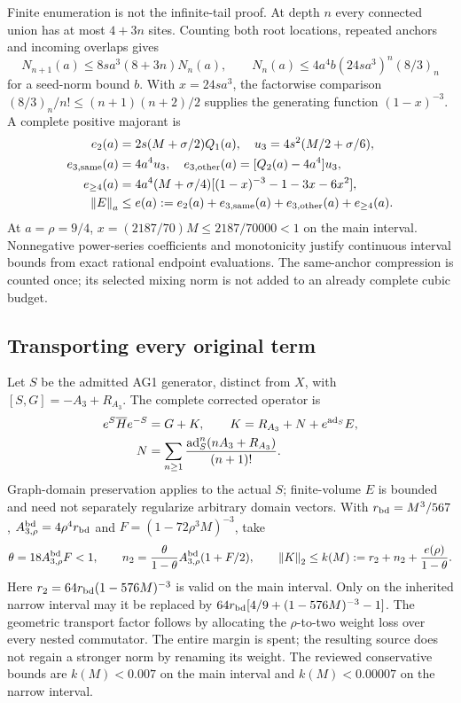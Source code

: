 Finite enumeration is not the infinite-tail proof. At depth $n$ every connected union has at most $4+3n$ sites. Counting both root locations, repeated anchors and incoming overlaps gives
\begin{equation}
N_{n+1}(a)\le8sa^3(8+3n)N_n(a),\qquad
N_n(a)\le4a^4b(24sa^3)^n(8/3)_n
\label{ag2:recurrence}
\end{equation}
for a seed-norm bound $b$. With $x=24sa^3$, the factorwise comparison
$(8/3)_n/n!\le(n+1)(n+2)/2$ supplies the generating function $(1-x)^{-3}$. A complete positive majorant is
\begin{align}
e_2(a)&=2s(M+\sigma/2)Q_1(a),\quad u_3=4s^2(M/2+\sigma/6),\nonumber\\
e_{3,\rm same}(a)&=4a^4u_3,\quad e_{3,\rm other}(a)=[Q_2(a)-4a^4]u_3,\nonumber\\
e_{\ge4}(a)&=4a^4(M+\sigma/4)[(1-x)^{-3}-1-3x-6x^2],\nonumber\\
\left\lVert E\right\rVert_a&\le e(a):=e_2(a)+e_{3,\rm same}(a)+e_{3,\rm other}(a)+e_{\ge4}(a).
\label{ag2:majorant}
\end{align}
At $a=\rho=9/4$, $x=(2187/70)M\le2187/70000<1$ on the main interval. Nonnegative power-series coefficients and monotonicity justify continuous interval bounds from exact rational endpoint evaluations. The same-anchor compression is counted once; its selected mixing norm is not added to an already complete cubic budget.

\subsection{Transporting every original term}
Let $S$ be the admitted AG1 generator, distinct from $X$, with $[S,G]=-A_3+R_{A_3}$. The complete corrected operator is
\begin{align}
e^S\overline He^{-S}&=G+K,\qquad
K=R_{A_3}+N+e^{\operatorname{ad}_S}E,\nonumber\\
N&=\sum_{n\ge1}\frac{\operatorname{ad}_S^n(nA_3+R_{A_3})}{(n+1)!}.
\label{ag2:transport}
\end{align}
Graph-domain preservation applies to the actual $S$; finite-volume $E$ is bounded and need not separately regularize arbitrary domain vectors. With $r_{\rm bd}=M^3/567$, $A_{3,\rho}^{\rm bd}=4\rho^4r_{\rm bd}$ and $F=(1-72\rho^3M)^{-3}$, take
\begin{equation}
\theta=18A_{3,\rho}^{\rm bd}F<1,\qquad
n_2=\frac{\theta}{1-\theta}A_{3,\rho}^{\rm bd}(1+F/2),\qquad
\left\lVert K\right\rVert_2\le k(M):=r_2+n_2+\frac{e(\rho)}{1-\theta}.
\label{ag2:k}
\end{equation}
Here $r_2=64r_{\rm bd}(1-576M)^{-3}$ is valid on the main interval. Only on the inherited narrow interval may it be replaced by
$64r_{\rm bd}[4/9+(1-576M)^{-3}-1]$. The geometric transport factor follows by allocating the $\rho$-to-two weight loss over every nested commutator. The entire margin is spent; the resulting source does not regain a stronger norm by renaming its weight. The reviewed conservative bounds are $k(M)<0.007$ on the main interval and $k(M)<0.00007$ on the narrow interval.


